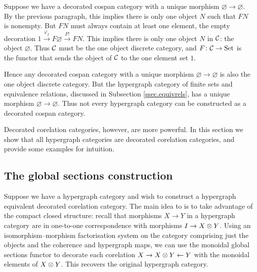 Suppose we have a decorated cospan category with a unique morphism $\varnothing
\to \varnothing$. By the previous paragraph, this implies there is only one
object $N$ such that $FN$ is nonempty. But $FN$ must always contain at least one
element, the empty decoration $1 \xrightarrow{\varphi_I} F\varnothing
\xrightarrow{F!} FN$. This implies there is only one object $N$ in $\mathcal C$: the
object $\varnothing$. Thus $\mathcal C$ must be the one object discrete category, and
$F{\colon} \mathcal C \to \mathrm{Set}$ is the functor that sends the object of $\mathcal C$ to the
one element set $1$.

Hence any decorated cospan category with a unique morphism $\varnothing \to
\varnothing$ is also the one object discrete category. But the hypergraph
category of finite sets and equivalence relations, discussed in Subsection
\ref{ssec.equivrels}, has a unique morphism $\varnothing \to \varnothing$.  Thus
not every hypergraph category can be constructed as a decorated cospan category.

Decorated corelation categories, however, are more powerful. In this section we
show that all hypergraph categories are decorated corelation categories, and
provide some examples for intuition.

\subsection{The global sections construction}
Suppose we have a hypergraph category and wish to construct a hypergraph
equivalent decorated corelation category. The main idea to is to take advantage
of the compact closed structure: recall that morphisms $X \to Y$ in a hypergraph
category are in one-to-one correspondence with morphisms $I \to X\otimes Y$. Using
an isomorphism--morphism factorisation system on the category comprising just
the objects and the coherence and hypergraph maps, we can use the monoidal
global sections functor to decorate each corelation $X \to X \otimes Y \leftarrow
Y$ with the monoidal elements of $X\otimes Y$. This recovers the original hypergraph
category.


